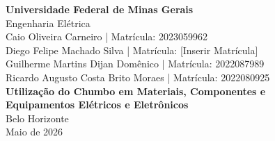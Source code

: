\documentclass[12pt]{article}
\begin{document}
\begin{titlepage}
  \centering
  {\large\textbf{Universidade Federal de Minas Gerais}}\\[0.3cm]
  {\large Engenharia Elétrica}\\[4cm]

  {\large Caio Oliveira Carneiro | Matrícula: 2023059962 \\[0.2cm]
          Diego Felipe Machado Silva | Matrícula: [Inserir Matrícula]\\[0.2cm]
          Guilherme Martins Dijan Domênico | Matrícula: 2022087989\\[0.2cm]
          Ricardo Augusto Costa Brito Moraes | Matrícula: 2022080925}\\[4cm]

  {\Large\textbf{Utilização do Chumbo em Materiais, Componentes e\\[0.2cm]
  Equipamentos Elétricos e Eletrônicos}}\\[4cm]

  \vfill
  {\large Belo Horizonte}\\[0.2cm]
  {\large Maio de 2026}
\end{titlepage}

\newpage
\thispagestyle{empty}
\tableofcontents
\newpage
\end{document}
